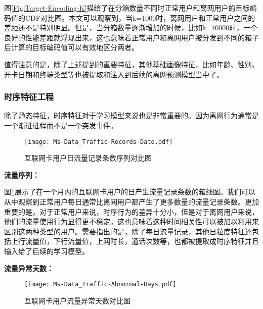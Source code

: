 图\ref{Fig:Target-Encoding-K}描绘了在分箱数量不同时正常用户和离网用户的目标编码值的CDF对比图。本文可以观察到，当k=1000时，离网用户和正常用户之间的差距还不是特别明显。但是，当分箱数量逐渐增加的时候，比如k=40000时，一个良好的性能差距就浮现出来，这也意味着正常用户和离网用户被分发到不同的箱子后计算的目标编码值可以有效地区分两者。\par
值得注意的是，除了上述提到的重要特征，其他基础画像特征，比如年龄、性别、开卡日期和终端类型等也被提取和注入到后续的离网预测模型当中了。


\subsubsection{时序特征工程}
除了静态特征，时序特征对于学习模型来说也是非常重要的。因为离网行为通常是一个渐进进程而不是一个突发事件。\par
\begin{figure}[h]
	\centering
	\texttt{[image: Ms-Data\_Traffic-Records-Date.pdf]}
	\caption{互联网卡用户日流量记录条数序列对比图}
	\label{Fig:Traffic-Records-Date}
\end{figure}

\textbf{流量序列：}

图\ref{Fig:Traffic-Records-Date}展示了在一个月内的互联网卡用户的日产生流量记录条数的箱线图。我们可以从中观察到正常用户每日通常比离网用户都产生了更多数量的流量记录条数。更加重要的是，对于正常用户来说，时序行为的差异十分小，但是对于离网用户来说，他们的流量使用行为显得更不稳定。这也意味着这种时间相关性可以被加以利用来区别这两种类型的用户。需要指出的是，除了每日流量记录，其他日粒度特征还包括上行流量值，下行流量值，上网时长，通话次数等，也都被提取成时序特征并且输入给了后续的学习模型。

\textbf{流量异常天数：}
\begin{figure}[!hbt]
	\centering
	\texttt{[image: Ms-Data\_Traffic-Abnormal-Days.pdf]}
	\caption{互联网卡用户流量异常天数对比图}
	\label{Fig:Traffic-Abnormal-Days}
\end{figure}

